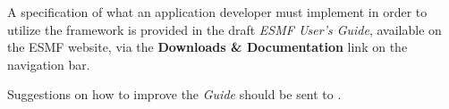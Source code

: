A specification of what an application developer must implement in
order to utilize the framework is provided in the draft {\it ESMF
User's Guide}\cite{bib:ESMFusrdoc}, available on the ESMF website, 
via the {\bf Downloads \& Documentation} link on the navigation bar.

Suggestions on how to improve the {\it Guide} should be sent to 
.





















